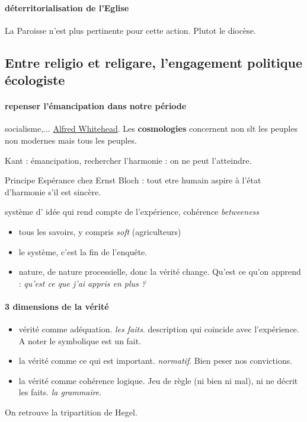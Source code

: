 \paragraph{déterritorialisation de l'Eglise} La Paroisse n'est plus pertinente pour cette action. Plutot le diocèse. 

\subsection{Entre religio et religare, l'engagement politique écologiste}


\paragraph{repenser l'émancipation dans notre période} socialisme,... 
\href{https://fr.wikipedia.org/wiki/Alfred_North_Whitehead}{Alfred Whitehead}. Les \textbf{cosmologies} concernent non slt les peuples non modernes mais tous les peuples.

Kant : émancipation, rechercher l'harmonie : on ne peut l'atteindre.

Principe Espérance chez Ernst Bloch : tout etre humain aspire à l'état d'harmonie s'il est sincère. 

\begin{Def}[Cosmologie]
système d' idée qui rend compte de l'expérience, cohérence \textit{betweeness}
\end{Def}

\begin{itemize}
    \item tous les savoirs, y compris \textit{soft} (agriculteurs)
    \item le système, c'est la fin de l'enquête. 
    \item nature, de nature processielle, donc la vérité change. Qu'est ce qu'on apprend : \textit{qu'est ce que j'ai appris en plus ? }
    
\end{itemize}

\paragraph{3 dimensions de la vérité} \begin{itemize}
    \item vérité comme adéquation. \textit{les faits}. description qui coincide avec l'expérience. A noter le symbolique est un fait. 
    \item la vérité comme ce qui est important. \textit{normatif}. Bien peser nos convictions. 
    \item la vérité comme cohérence logique. Jeu de règle (ni bien ni mal), ni ne décrit les faits. \textit{la grammaire}.
\end{itemize}
On retrouve la tripartition de Hegel. 

